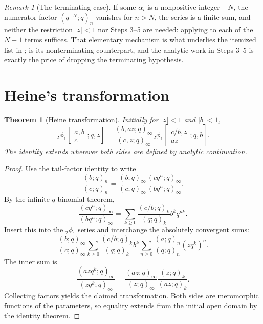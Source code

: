 \documentclass[11pt,oneside,openany]{book}
\newtheorem{theorem}{Theorem}[chapter]
\theoremstyle{definition}
\theoremstyle{remark}
\newtheorem{remark}[remark]{Remark}
\newcommand{\poch}[3]{(#1;#2)_{#3}}
\newcommand{\abs}[1]{\lvert #1\rvert}
\begin{document}
\begin{remark}[The terminating case]\label{rem:classical-limit-terminating}
If some $\alpha_i$ is a nonpositive integer $-N$, the numerator factor $\poch{q^{-N}}{q}{n}$ vanishes for $n>N$, the series is a finite sum, and neither the restriction $\abs z<1$ nor Steps 3--5 are needed: applying  to each of the $N+1$ terms suffices.  That elementary mechanism is what underlies the itemized list in ;  is its nonterminating counterpart, and the analytic work in Steps 3--5 is exactly the price of dropping the terminating hypothesis.
\end{remark}

\section{Heine's transformation}

\begin{theorem}[Heine transformation]\label{thm:heine}
Initially for $\abs z<1$ and $\abs b<1$,
\[
 {}_2\phi_1\!\left[\begin{matrix}a,b\\c\end{matrix};q,z\right]
 =\frac{(b,az;q)_\infty}{(c,z;q)_\infty}
 {}_2\phi_1\!\left[\begin{matrix}c/b,z\\az\end{matrix};q,b\right].
\]
The identity extends wherever both sides are defined by analytic continuation.
\end{theorem}

\begin{proof}
Use the tail-factor identity to write
\[
 \frac{(b;q)_n}{(c;q)_n}
 =\frac{(b;q)_\infty}{(c;q)_\infty}
 \frac{(cq^n;q)_\infty}{(bq^n;q)_\infty}.
\]
By the infinite $q$-binomial theorem,
\[
 \frac{(cq^n;q)_\infty}{(bq^n;q)_\infty}
 =\sum_{k\ge0}\frac{(c/b;q)_k}{(q;q)_k}b^kq^{nk}.
\]
Insert this into the ${}_2\phi_1$ series and interchange the absolutely convergent sums:
\[
 \frac{(b;q)_\infty}{(c;q)_\infty}
 \sum_{k\ge0}\frac{(c/b;q)_k}{(q;q)_k}b^k
 \sum_{n\ge0}\frac{(a;q)_n}{(q;q)_n}(zq^k)^n.
\]
The inner sum is
\[
 \frac{(azq^k;q)_\infty}{(zq^k;q)_\infty}
 =\frac{(az;q)_\infty}{(z;q)_\infty}
 \frac{(z;q)_k}{(az;q)_k}.
\]
Collecting factors yields the claimed transformation.  Both sides are meromorphic functions of the parameters, so equality extends from the initial open domain by the identity theorem.
\end{proof}
\end{document}
